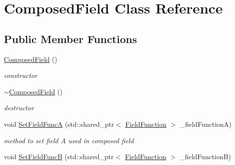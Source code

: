 \hypertarget{classComposedField}{}\section{Composed\+Field Class Reference}
\label{classComposedField}
\subsection*{Public Member Functions}
\begin{DoxyCompactItemize}
\item 
\hyperlink{classComposedField_a98e22a3fe5343bfd34713cc81d585fd3}{Composed\+Field} ()\hypertarget{classComposedField_a98e22a3fe5343bfd34713cc81d585fd3}{}\label{classComposedField_a98e22a3fe5343bfd34713cc81d585fd3}

\begin{DoxyCompactList}\small\item\em constructor \end{DoxyCompactList}\item 
\hyperlink{classComposedField_a7a13e95f41c6cb6db9748251afa827ba}{$\sim$\+Composed\+Field} ()\hypertarget{classComposedField_a7a13e95f41c6cb6db9748251afa827ba}{}\label{classComposedField_a7a13e95f41c6cb6db9748251afa827ba}

\begin{DoxyCompactList}\small\item\em destructor \end{DoxyCompactList}\item 
void \hyperlink{classComposedField_ae08818f972e64dd8203d47f5b9ab3ab1}{Set\+Field\+FuncA} (std\+::shared\+\_\+ptr$<$ \hyperlink{classFieldFunction}{Field\+Function} $>$ \+\_\+field\+FunctionA)\hypertarget{classComposedField_ae08818f972e64dd8203d47f5b9ab3ab1}{}\label{classComposedField_ae08818f972e64dd8203d47f5b9ab3ab1}

\begin{DoxyCompactList}\small\item\em method to set field A used in composed field \end{DoxyCompactList}\item 
void \hyperlink{classComposedField_a35d305aa29bbdf99aa102bdf6229bc5f}{Set\+Field\+FuncB} (std\+::shared\+\_\+ptr$<$ \hyperlink{classFieldFunction}{Field\+Function} $>$ \+\_\+field\+FunctionB)\hypertarget{classComposedField_a35d305aa29bbdf99aa102bdf6229bc5f}{}\label{classComposedField_a35d305aa29bbdf99aa102bdf6229bc5f}


\end{DoxyCompactItemize}
